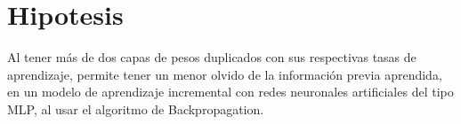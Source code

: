 \section{Hipotesis}
    Al tener m\'as de dos capas de pesos duplicados con sus respectivas tasas de aprendizaje, permite tener un menor olvido de la información previa aprendida, en un modelo de aprendizaje incremental con redes neuronales artificiales del tipo MLP, al usar el algoritmo de Backpropagation.  
